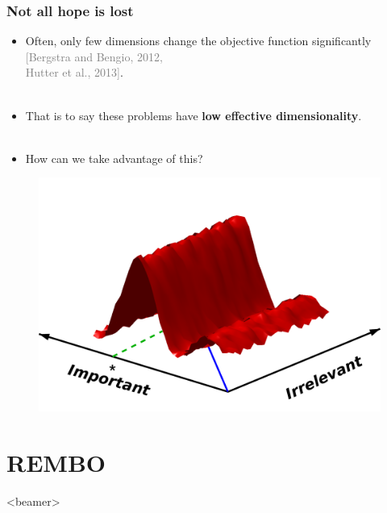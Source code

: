 \documentclass[grey]{beamer}
\begin{document}
   
 \begin{frame}
   \frametitle{Not all hope is lost}
    \begin{minipage}[l]{0.60\columnwidth}
     \begin{itemize}
      \item Often, only few dimensions change the objective function significantly
       \textcolor{gray}{[Bergstra and Bengio, 2012,\\Hutter et al., 2013]}.\\~\\
      \item That is to say these problems have 
       {\bf \textcolor{myColor}{low effective dimensionality}}.\\~\\
       \item How can we take advantage of this?
     \end{itemize}

    \end{minipage}
    \begin{minipage}[r]{0.38\columnwidth}
     \begin{figure}[t]
      \includegraphics[width = 1.25\columnwidth]
      {./figs/2to1embedding.pdf}
      \label{fig:ESSL_BLR}
     \end{figure}
    \end{minipage}
  \end{frame}

  
\section{REMBO}
 \begin{frame}<beamer>
  \tableofcontents[currentsection]
 \end{frame}
\end{document}
